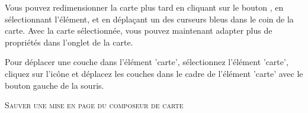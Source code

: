 {%
Vous pouvez redimensionner la carte plus tard en cliquant sur le bouton
, en sélectionnant
l'élément, et en déplaçant un des curseurs bleus dans le coin de la carte. Avec
la carte sélectionnée, vous pouvez maintenant adapter plus de propriétés dans
l'onglet  de la carte.

Pour déplacer une couche dans l'élément 'carte', sélectionnez l'élément 'carte',
cliquez sur l'icône  et déplacez les couches dans le cadre de l'élément 'carte' avec le
bouton gauche de la souris.

\begin{Tip}\caption{\textsc{Sauver une mise en page du composeur de carte}}
\end{Tip} 

}
